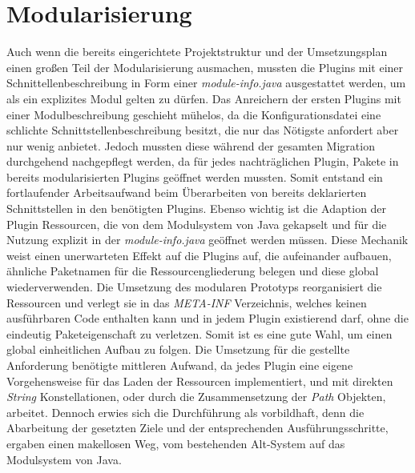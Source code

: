 \section{Modularisierung}
Auch wenn die bereits eingerichtete Projektstruktur und der Umsetzungsplan einen großen Teil der Modularisierung ausmachen, mussten die Plugins mit einer Schnittellenbeschreibung in Form einer \textit{module-info.java} ausgestattet werden, um als ein explizites Modul gelten zu dürfen. Das Anreichern der ersten Plugins mit einer Modulbeschreibung geschieht mühelos, da die Konfigurationsdatei eine schlichte Schnittstellenbeschreibung besitzt, die nur das Nötigste anfordert aber nur wenig anbietet. Jedoch mussten diese während der gesamten Migration durchgehend nachgepflegt werden, da für jedes nachträglichen Plugin, Pakete in bereits modularisierten Plugins geöffnet werden mussten. Somit entstand ein fortlaufender Arbeitsaufwand beim Überarbeiten von bereits deklarierten Schnittstellen in den benötigten Plugins.\newline
Ebenso wichtig ist die Adaption der Plugin Ressourcen, die von dem Modulsystem von Java gekapselt und für die Nutzung explizit in der \textit{module-info.java} geöffnet werden müssen. Diese Mechanik weist einen unerwarteten Effekt auf die Plugins auf, die aufeinander aufbauen, ähnliche Paketnamen für die Ressourcengliederung belegen und diese global wiederverwenden.\newline
Die Umsetzung des modularen Prototyps reorganisiert die Ressourcen und verlegt sie in das \textit{META-INF} Verzeichnis, welches keinen ausführbaren Code enthalten kann und in jedem Plugin existierend darf, ohne die eindeutig Paketeigenschaft zu verletzen. Somit ist es eine gute Wahl, um einen global einheitlichen Aufbau zu folgen. Die Umsetzung für die gestellte Anforderung benötigte mittleren Aufwand, da jedes Plugin eine eigene Vorgehensweise für das Laden der Ressourcen implementiert, und mit direkten \textit{String} Konstellationen, oder durch die Zusammensetzung der \textit{Path} Objekten, arbeitet. \newline
Dennoch erwies sich die Durchführung als vorbildhaft, denn die Abarbeitung der gesetzten Ziele und der entsprechenden Ausführungsschritte, ergaben einen makellosen Weg, vom bestehenden Alt-System auf das Modulsystem von Java.\bigbreak

